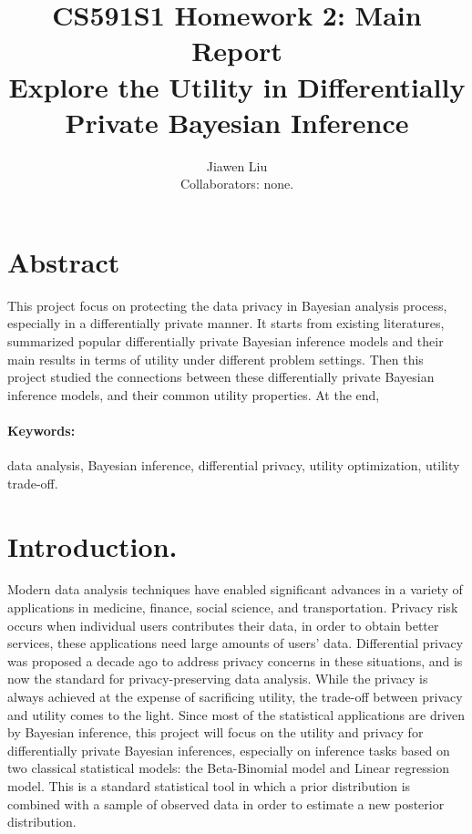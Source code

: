 \documentclass{article}
\begin{document}
\title{
{\textbf{CS591S1 Homework 2: Main Report}\\
\large{Explore the Utility in Differentially Private Bayesian Inference}}
}
\author{Jiawen Liu\\
Collaborators: none.}

\date{}
\maketitle

\section{Abstract}
This project focus on protecting the data privacy in Bayesian analysis process, especially in a differentially private manner.
It starts from existing literatures, summarized popular differentially private Bayesian inference models and their main results in terms of utility under different problem settings.
Then this project studied the connections between these differentially private Bayesian inference models,
and their common utility properties. At the end, 


\paragraph{Keywords:} data analysis, Bayesian inference, differential privacy, utility optimization, utility trade-off.

\section{Introduction.}
Modern data analysis techniques have enabled significant
advances in a variety of applications in medicine, finance,
social science, and transportation. Privacy risk occurs when individual users contributes their data, in order to obtain better
services, these applications need large amounts of users’ data. 
Differential privacy was proposed a decade ago to address privacy concerns in these situations, and is now the standard for privacy-preserving data analysis.
While the privacy is always achieved at the expense of sacrificing utility, the trade-off between privacy and utility comes to the light.
Since most of the statistical applications are driven by Bayesian inference, this project will focus on the utility and privacy for differentially private Bayesian inferences, especially on inference tasks based on two classical statistical models: the Beta-Binomial model and Linear regression model.
This is a standard statistical tool in which a prior distribution is combined
with a sample of observed data in order to estimate a new posterior distribution.
\end{document}
